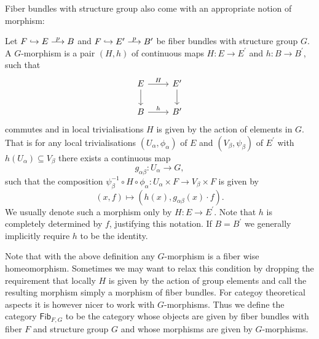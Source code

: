 Fiber bundles with structure group also come with an appropriate notion of morphism:

\begin{definition}
    \label{fiber_bundles:def:bundle_morphism}
    Let $F \hookrightarrow E \oset[0.5pt]{\scalebox{0.8}{$p$}}{\longrightarrow} B$ and $F \hookrightarrow E^\prime \oset[0.5pt]{\scalebox{0.8}{$p$}}{\longrightarrow} B^\prime$ be fiber bundles with structure group $G$. A $G$-morphism is a pair $(H,h)$ of continuous maps $H \colon E \to E^\prime$ and $h \colon B \to B^\prime$, such that 
        \[\begin{tikzcd}
        E & {E^\prime} \\
        B & {B^\prime}
        \arrow["H", from=1-1, to=1-2]
        \arrow[from=1-1, to=2-1]
        \arrow[from=1-2, to=2-2]
        \arrow["h", from=2-1, to=2-2]
        \end{tikzcd}\]
        commutes and in local trivialisations $H$ is given by the action of elements in $G$. That is for any local trivialisations $(U_\alpha,\phi_\alpha)$ of $E$ and $(V_\beta,\psi_\beta)$ of $E^\prime$ with $h(U_\alpha) \subseteq V_\beta$ there exists a continuous map 
        \[
        g_{\alpha\beta} \colon U_\alpha \to G,
        \] 
        such that the composition $\psi_\beta^{-1} \circ H \circ \phi_\alpha \colon U_\alpha \times F \to V_\beta \times F$ is given by 
        \[
        (x,f) \mapsto (h(x),g_{\alpha\beta}(x) \cdot f).
        \]
        We usually denote such a morphism only by $H \colon E \to E^\prime$. Note that $h$ is completely determined by $f$, justifying this notation. If $B = B^\prime$ we generally implicitly require $h$ to be the identity. 
\end{definition}

Note that with the above definition any $G$-morphism is a fiber wise homeomorphism. Sometimes we may want to relax this condition by dropping the requirement that locally $H$ is given by the action of group elements and call the resulting morphism simply a morphism of fiber bundles. For categoy theoretical aspects it is however nicer to work with $G$-morphisms. Thus we define the category $\mathsf{Fib}_{F,G}$ to be the category whose objects are given by fiber bundles with fiber $F$ and structure group $G$ and whose morphisms are given by $G$-morphisms.


